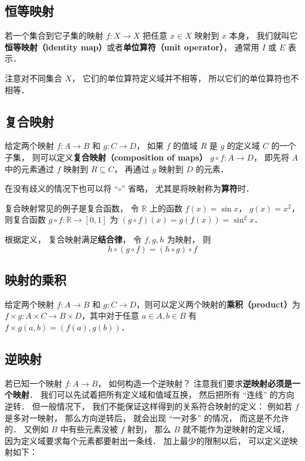 \subsection{恒等映射}
\begin{definition}{}
若一个集合到它子集的映射 $f:X\to X$ 把任意 $x\in X$ 映射到 $x$ 本身， 我们就叫它\textbf{恒等映射（identity map）}或者\textbf{单位算符（unit operator）}， 通常用 $I$ 或 $E$ 表示．
\end{definition}
注意对不同集合 $X$， 它们的单位算符定义域并不相等， 所以它们的单位算符也不相等．

\subsection{复合映射}
\begin{definition}{}
给定两个映射 $f:A\to B$ 和 $g:C\to D$， 如果 $f$ 的值域 $R$ 是 $g$ 的定义域 $C$ 的一个子集， 则可以定义\textbf{复合映射（composition of maps）} $g\circ f: A\to D$， 即先将 $A$ 中的元素通过 $f$ 映射到 $R \subseteq C$， 再通过 $g$ 映射到 $D$ 的元素．
\end{definition}
在没有歧义的情况下也可以将 “$\circ$” 省略， 尤其是将映射称为\textbf{算符}时．

复合映射常见的例子是复合函数， 令 $\mathbb R$ 上的函数 $f(x) = \sin x$， $g(x) = x^2$， 则复合函数 $g\circ f: \mathbb R \to [0, 1]$ 为 $(g\circ f)(x) = g(f(x)) = \sin^2 x$．

根据定义， 复合映射满足\textbf{结合律}， 令 $f, g, h$ 为映射， 则
\begin{equation}
h \circ (g \circ f) = (h \circ g) \circ f
\end{equation}

\subsection{映射的乘积}

\begin{definition}{}\label{map_def2}
给定两个映射 $f:A\to B$ 和 $g:C\to D$，则可以定义两个映射的\textbf{乘积（product）}为 $f\times g:A\times C\to B\times D$，其中对于任意 $a\in A, b\in B$ 有 $f\times g(a, b)=(f(a), g(b))$．
\end{definition}

\subsection{逆映射}
若已知一个映射 $f: A\to B$， 如何构造一个逆映射？ 注意我们要求\textbf{逆映射必须是一个映射}． 我们可以先试着把所有定义域和值域互换， 然后把所有 “连线” 的方向逆转． 但一般情况下， 我们不能保证这样得到的关系符合映射的定义： 例如若 $f$ 是多对一映射， 那么方向逆转后， 就会出现 “一对多” 的情况， 而这是不允许的． 又例如 $B$ 中有些元素没被 $f$ 射到， 那么 $B$ 就不能作为逆映射的定义域， 因为定义域要求每个元素都要射出一条线． 加上最少的限制以后， 可以定义逆映射如下：

